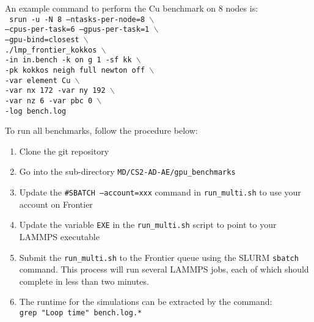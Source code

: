 \documentclass[conference]{IEEEtran}
\begin{document}
An example command to perform the Cu benchmark on 8 nodes is: \\
\texttt{%
\phantom{xxx}srun -u -N 8 --ntasks-per-node=8 $\backslash$ \\
 \phantom{xxxxx}--cpus-per-task=6 --gpus-per-task=1 $\backslash$ \\
 \phantom{xxxxx}--gpu-bind=closest $\backslash$ \\
 \phantom{xxxxx}./lmp\_frontier\_kokkos $\backslash$ \\
 \phantom{xxxxx}-in in.bench -k on g 1 -sf kk $\backslash$ \\
 \phantom{xxxxx}-pk kokkos neigh full newton off $\backslash$ \\
\phantom{xxxxx}-var element Cu $\backslash$ \\
\phantom{xxxxx}-var nx 172 -var ny 192 $\backslash$ \\
\phantom{xxxxx}-var nz 6 -var pbc 0 $\backslash$ \\
\phantom{xxxxx}-log bench.log
}

To run all benchmarks, follow the procedure below:
\begin{enumerate}
\item	Clone the git repository\\ \phantom{xxx}\gitrepo %
\item	Go into the sub-directory \texttt{MD/CS2-AD-AE/gpu\_benchmarks}

\item	Update the \texttt{\#SBATCH --account=xxx} command in \texttt{run\_multi.sh} to use your account on Frontier

\item Update the variable \texttt{EXE} in the \texttt{run\_multi.sh} script to point to your LAMMPS executable

\item Submit the \texttt{run\_multi.sh} to the Frontier queue using the SLURM \texttt{sbatch} command. This process will run several LAMMPS jobs, each of which should complete in less than two minutes.

\item	The runtime for the simulations can be extracted by the command:\\
     \phantom{xxx}\texttt{grep "Loop time" bench.log.*}
\end{enumerate}

\newartifact

\artrel
\end{document}
